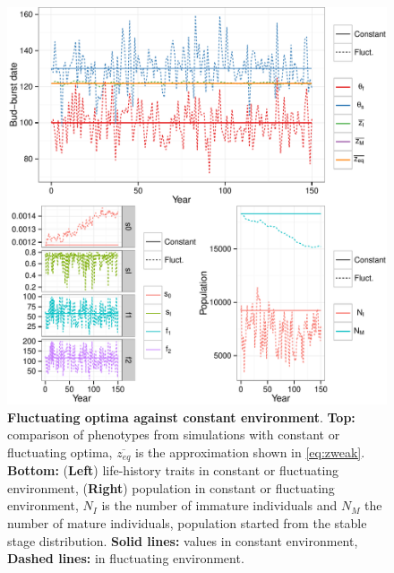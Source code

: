 \begin{figure}[ht!]
	\centering
	\includegraphics[scale=1]{Figures/PhenoLHTwithCorr.pdf}
	\caption{\textbf{Fluctuating optima against constant environment}. \textbf{Top:} comparison of phenotypes from simulations with constant or fluctuating optima, $\overline{z_{eq}}$ is the approximation shown in \autoref{eq:zweak}. \textbf{Bottom:} (\textbf{Left}) life-history traits in constant or fluctuating environment, (\textbf{Right}) population in constant or fluctuating environment, $N_I$ is the number of immature individuals and $N_M$ the number of mature individuals, population started from the stable stage distribution. \textbf{Solid lines:} values in constant environment, \textbf{Dashed lines:} in fluctuating environment.}
	\label{fig:corr}
\end{figure}

